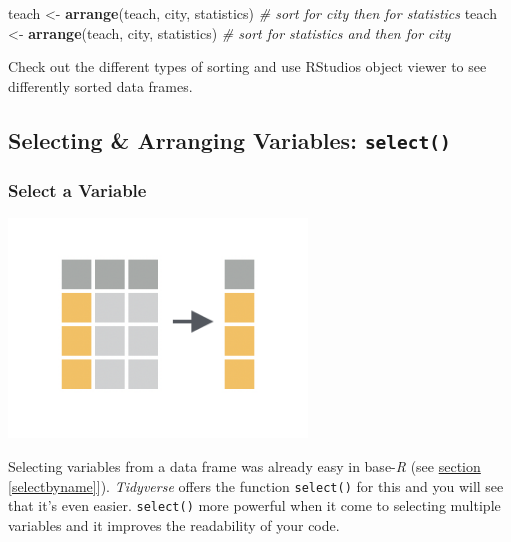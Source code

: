 \documentclass[
]{scrartcl}
\makeatletter
\newenvironment{Shaded}{\begin{snugshade}}{\end{snugshade}}
\newcommand{\CommentTok}[1]{\textcolor[rgb]{0.56,0.35,0.01}{\textit{#1}}}
\newcommand{\FunctionTok}[1]{\textcolor[rgb]{0.13,0.29,0.53}{\textbf{#1}}}
\newcommand{\NormalTok}[1]{#1}
\newcommand{\OtherTok}[1]{\textcolor[rgb]{0.56,0.35,0.01}{#1}}
\newenvironment{kframe}{%
\medskip{}
\setlength{\fboxsep}{.8em}
 \def\at@end@of@kframe{}%
 \ifinner\ifhmode%
  \def\at@end@of@kframe{\end{minipage}}%
  \begin{minipage}{\columnwidth}%
 \fi\fi%
 \def\FrameCommand##1{\hskip\@totalleftmargin \hskip-\fboxsep
 \colorbox{shadecolor}{##1}\hskip-\fboxsep
     \hskip-\linewidth \hskip-\@totalleftmargin \hskip\columnwidth}%
 \MakeFramed {\advance\hsize-\width
   \@totalleftmargin\z@ \linewidth\hsize
   \@setminipage}}%
 {\par\unskip\endMakeFramed%
 \at@end@of@kframe}
\newenvironment{rmdblock}[1]
  {
  \begin{itemize}
  \renewcommand{\labelitemi}{
    \raisebox{-.7\height}[0pt][0pt]{
      {\setkeys{Gin}{width=3em,keepaspectratio}\texttt{[image: images/\#1]}}
    }
  }
  \setlength{\fboxsep}{1em}
  \begin{kframe}
  \item
  }
  {
  \end{kframe}
  \end{itemize}
  }
\newenvironment{myexercise}
    {\begin{rmdblock}{exercise_green}}
    {\end{rmdblock}}
\makeatother
\begin{document}
\begin{Shaded}
\begin{Highlighting}[]
\NormalTok{teach }\OtherTok{\textless{}{-}} \FunctionTok{arrange}\NormalTok{(teach, city, statistics) }\CommentTok{\# sort for city then for statistics}
\NormalTok{teach }\OtherTok{\textless{}{-}} \FunctionTok{arrange}\NormalTok{(teach, city, statistics) }\CommentTok{\# sort for statistics and then for city}
\end{Highlighting}
\end{Shaded}

\begin{myexercise}
Check out the different types of sorting and use RStudios object viewer
to see differently sorted data frames.
\end{myexercise}

\hypertarget{selecting-arranging-variables-select}{%
\subsection{\texorpdfstring{Selecting \& Arranging Variables: \texttt{select()}}{Selecting \& Arranging Variables: select()}}\label{selecting-arranging-variables-select}}

\hypertarget{select-a-variable}{%
\subsubsection{Select a Variable}\label{select-a-variable}}

\begin{center}\includegraphics[width=300px]{images/dplyr-select} \end{center}

Selecting variables from a data frame was already easy in base-\emph{R} (see \protect\hyperlink{selectbyname}{section} \ref{selectbyname}{]}). \emph{Tidyverse} offers the function \texttt{select()} for this and you will see that it's even easier. \texttt{select()} more powerful when it come to selecting multiple variables and it improves the readability of your code.
\end{document}
